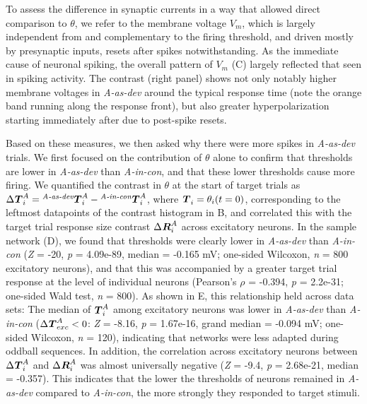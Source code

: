 \documentclass[9pt,lineno,onehalfspacing]{elife}
\newcommand{\dev}{\textit{A-as-dev}}
\newcommand{\msc}{\textit{A-in-con}}
\newcommand{\std}{\textit{A-as-std}}
\newcommand{\ifstringequal}[4]{%
  \ifnum\pdfstrcmp{#1}{#2}=0
  #3%
  \else
  #4%
  \fi
}
\newcommand{\seqreplace}[1]{\ifstringequal{dev}{#1}{\dev}{%
    \ifstringequal{std}{#1}{\std}{%
        \ifstringequal{msc}{#1}{\msc}{#1}%
    }%
}}
\newcommand{\R}[3][]{{}^{\seqreplace{#1}}_{}\boldsymbol R^{#2}_{#3}}
\newcommand{\T}[3][]{{}^{\seqreplace{#1}}_{}\boldsymbol T^{#2}_{#3}}
\begin{document}
To assess the difference in synaptic currents in a way that allowed direct comparison to $\theta$, we refer to the membrane voltage $V_m$, which is largely independent from and complementary to the firing threshold, and driven mostly by presynaptic inputs, resets after spikes notwithstanding. As the immediate cause of neuronal spiking, the overall pattern of $V_m$ (C) largely reflected that seen in spiking activity. The contrast (right panel) shows not only notably higher membrane voltages in \dev{} around the typical response time (note the orange band running along the response front), but also greater hyperpolarization starting immediately after due to post-spike resets.

Based on these measures, we then asked why there were more spikes in \dev{} trials. We first focused on the contribution of $\theta$ alone to confirm that thresholds are lower in \dev{} than \msc{}, and that these lower thresholds cause more firing. We quantified the contrast in $\theta$ at the start of target trials as $\Delta \T{A}{i} = \T[dev]{A}{i} - \T[msc]{A}{i}$, where $\T{}{i} = \theta_i(t=0)$, corresponding to the leftmost datapoints of the contrast histogram in B, and correlated this with the target trial response size contrast $\Delta \R{A}{i}$ across excitatory neurons. In the sample network (D), we found that thresholds were clearly lower in \dev{} than \msc{} (\textit{Z} = -20, \textit{p} = 4.09e-89, median = -0.165 mV; one-sided Wilcoxon, \textit{n} = 800 excitatory neurons), and that this was accompanied by a greater target trial response at the level of individual neurons (Pearson's $\rho$ = -0.394, \textit{p} = 2.2e-31; one-sided Wald test, \textit{n} = 800). As shown in E, this relationship held across data sets: The median of $\T{A}{i}$ among excitatory neurons was lower in \dev{} than \msc{} ($\Delta \T{A}{exc} < 0$: \textit{Z} = -8.16, \textit{p} = 1.67e-16, grand median = -0.094 mV; one-sided Wilcoxon, \textit{n} = 120), indicating that networks were less adapted during oddball sequences. In addition, the correlation across excitatory neurons between $\Delta \T{A}{i}$ and $\Delta \R{A}{i}$ was almost universally negative (\textit{Z} = -9.4, \textit{p} = 2.68e-21, median = -0.357). This indicates that the lower the thresholds of neurons remained in \dev{} compared to \msc{}, the more strongly they responded to target stimuli.
\end{document}
